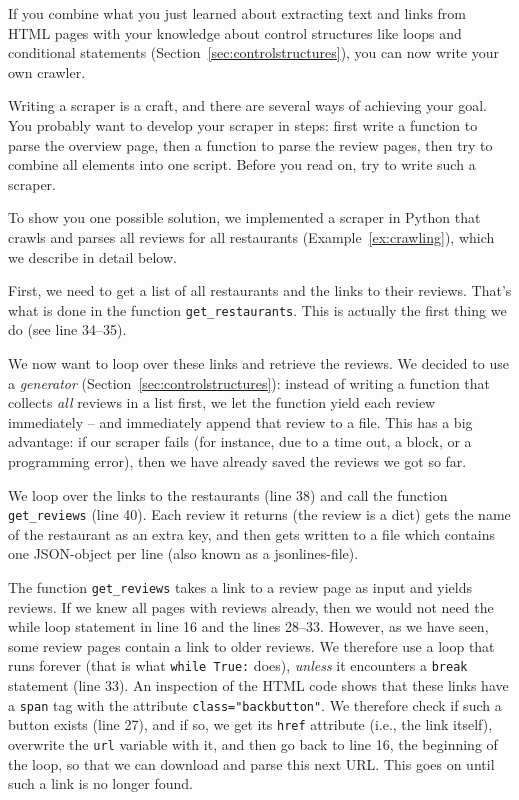 If you combine what you just learned about extracting text and links from HTML
pages with your knowledge about control structures like loops and conditional
statements (Section~\ref{sec:controlstructures}), you can now write your own crawler.

Writing a scraper is a craft, and there are several ways of achieving your goal.
You probably want to develop your scraper in steps: first write a function to
parse the overview page, then a function to parse the review pages, then try
to combine all elements into one script. Before you read on, try to write
such a scraper.

To show you one possible solution, we implemented a scraper in Python
that crawls and parses all reviews for all restaurants
(Example~\ref{ex:crawling}), which we describe in detail below.


First, we need to get a list of all restaurants and the links to their
reviews. That's what is done in the function \verb|get_restaurants|. This
is actually the first thing we do (see line 34--35).

We now want to loop over these links and retrieve the reviews.  We
decided to use a \emph{generator} (Section~\ref{sec:controlstructures}): instead of writing a
function that collects \emph{all} reviews in a list first, we let the
function yield each review immediately -- and immediately append that review
to a file. This has a big advantage: if our scraper fails (for
instance, due to a time out, a block, or a programming error), then we
have already saved the reviews we got so far.

We loop over the links to the restaurants (line 38) and call the
function \verb|get_reviews| (line 40). Each review it returns (the review
is a  dict) gets the name of the restaurant as an extra key, and then
gets written to a file which contains one JSON-object per line (also
known as a jsonlines-file).

The function \verb|get_reviews| takes a link to a review page as input and
yields reviews. If we knew all pages with reviews already, then we
would not need the while loop statement in line 16 and the lines
28--33. However, as we have seen, some review pages contain a link to
older reviews. We therefore use a loop that runs forever (that is what
\verb|while True:| does), \emph{unless} it encounters a \verb|break| statement
(line 33).  An inspection of the HTML code shows that these links have
a \verb|span| tag with the attribute \verb|class="backbutton"|. We therefore
check if such a button exists (line 27), and if so, we get its \verb|href|
attribute (i.e., the link itself), overwrite the \verb|url| variable with
it, and then go back to line 16, the beginning of the loop, so that we
can download and parse this next URL.  This goes on until such a
link is no longer found.



